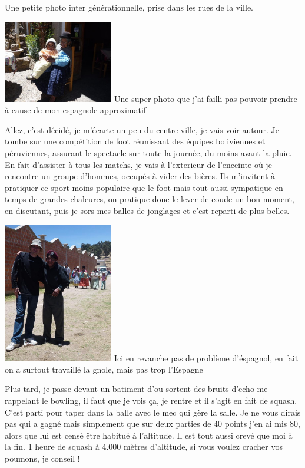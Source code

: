 \begin{multicols}{2}
Une petite photo inter générationnelle, prise dans les rues de la ville.

\hspace*{-0.65cm}
\includegraphics[width=4.8cm]{articles/Arequipa-colca-titicaca/1256606974OTlv.jpg}
Une super photo que j'ai failli pas pouvoir prendre à cause de mon espagnole approximatif

Allez, c'est décidé, je m'écarte un peu du centre ville, je vais voir autour. Je tombe sur une compétition de foot réunissant des équipes boliviennes et péruviennes, assurant le spectacle sur toute la journée, du moins avant la pluie. En fait d'assister à tous les matchs, je vais à l'exterieur de l'enceinte où je rencontre un groupe d'hommes, occupés à vider des bières. Ils m'invitent à pratiquer ce sport moins populaire que le foot mais tout aussi sympatique en temps de grandes chaleures, on pratique donc le lever de coude un bon moment, en discutant, puis je sors mes balles de jonglages et c'est reparti de plus belles.

\hspace*{-0.65cm}
\includegraphics[width=4.8cm]{articles/Arequipa-colca-titicaca/1256606985kcoP.jpg}
Ici en revanche pas de problème d'éspagnol, en fait on a surtout travaillé la gnole, mais pas trop l'Espagne

Plus tard, je passe devant un batiment d'ou sortent des bruits d'echo me rappelant le bowling, il faut que je vois ça, je rentre et il s'agit en fait de squash. C'est parti pour taper dans la balle avec le mec qui gère la salle. Je ne vous dirais pas qui a gagné mais simplement que sur deux parties de 40 points j'en ai mis 80, alors que lui est censé être habitué à l'altitude. Il est tout aussi crevé que moi à la fin. 1 heure de squash à 4.000 mètres d'altitude, si vous voulez cracher vos poumons, je conseil !


\end{multicols}

